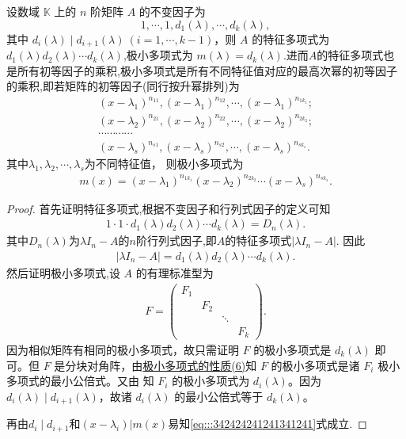 \documentclass[../../main.tex]{subfiles}
\begin{document}
\begin{theorem}[极小多项式就是幂次最大的不变因子]\label{theorem:极小多项式与不变因子的关系}
设数域 $\mathbb{K}$ 上的 $n$ 阶矩阵 $A$ 的不变因子为
\[
1,\cdots,1,d_1(\lambda),\cdots,d_k(\lambda),
\]
其中 $d_i(\lambda)\mid d_{i + 1}(\lambda)\ (i = 1,\cdots,k - 1)$，则 $A$ 的特征多项式为$d_1(\lambda)d_2(\lambda)\cdots d_k(\lambda)$,极小多项式为 $m(\lambda)=d_k(\lambda)$.进而$A$的特征多项式也是所有初等因子的乘积,极小多项式是所有不同特征值对应的最高次幂的初等因子的乘积,即若矩阵的初等因子(同行按升幂排列)为
\begin{gather*}
(x-\lambda _1)^{n_{11}},(x-\lambda _1)^{n_{12}},\cdots ,(x-\lambda _1)^{n_{1k_1}}; 
\\
(x-\lambda _2)^{n_{21}},(x-\lambda _2)^{n_{22}},\cdots ,(x-\lambda _2)^{n_{2k_2}}; 
\\
\cdots \cdots \cdots \cdots 
\\
(x-\lambda _s)^{n_{s1}},(x-\lambda _s)^{n_{s2}},\cdots ,(x-\lambda _s)^{n_{sk_s}}.
\end{gather*}
其中\(\lambda_1,\lambda_2,\cdots,\lambda_s\)为不同特征值，
则极小多项式为
\begin{align}\label{eq:::342424241241341241}
m(x)=(x-\lambda _1)^{n_{1k_1}}(x-\lambda _2)^{n_{2k_2}}\cdots (x-\lambda _s)^{n_{sk_s}}.
\end{align}
\end{theorem}
\begin{proof}
首先证明特征多项式,根据不变因子和行列式因子的定义可知
\begin{align*}
1\cdot 1\cdot d_1(\lambda)d_2(\lambda)\cdots d_k(\lambda)=D_n(\lambda).
\end{align*}
其中$D_n(\lambda)$为$\lambda I_n-A$的$n$阶行列式因子,即$A$的特征多项式$|\lambda I_n-A|$.
因此
\begin{align*}
|\lambda I_n-A|=d_1(\lambda)d_2(\lambda)\cdots d_k(\lambda).
\end{align*}
然后证明极小多项式,设 $A$ 的有理标准型为
\begin{align*}
F = \begin{pmatrix}
F_1 & & & \\
& F_2 & & \\
& & \ddots & \\
& & & F_k
\end{pmatrix}.
\end{align*}
因为相似矩阵有相同的极小多项式，故只需证明 $F$ 的极小多项式是 $d_k(\lambda)$ 即可。但 $F$ 是分块对角阵，由\hyperref[proposition:极小多项式的性质]{极小多项式的性质(6)}知 $F$ 的极小多项式是诸 $F_i$ 极小多项式的最小公倍式。又由 知 $F_i$ 的极小多项式为 $d_i(\lambda)$。因为 $d_i(\lambda)\mid d_{i + 1}(\lambda)$，故诸 $d_i(\lambda)$ 的最小公倍式等于 $d_k(\lambda)$。

再由$d_i\mid d_{i+1}$和$(x-\lambda_i)|m(x)$易知\eqref{eq:::342424241241341241}式成立.

\end{proof}
\end{document}
